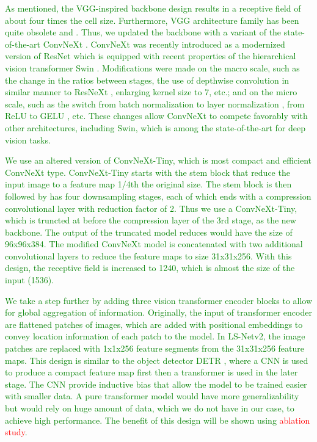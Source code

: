 \documentclass[journal]{IEEEtran}
\begin{document}
\textcolor{green}{As mentioned, the VGG-inspired backbone design results in a receptive field of about four times the cell size. Furthermore, VGG architecture family has been quite obsolete and . Thus, we updated the backbone with a variant of the state-of-the-art ConvNeXt \cite{convnext}. ConvNeXt was recently introduced as a modernized version of ResNet \cite{resnet} which is equipped with recent properties of the hierarchical vision transformer Swin \cite{swin}. Modifications were made on the macro scale, such as the change in the ratios between stages, the use of depthwise convolution in similar manner to ResNeXt \cite{resnext}, enlarging kernel size to 7, etc.; and on the micro scale, such as the switch from batch normalization \cite{batchnorm} to layer normalization \cite{layernorm}, from ReLU \cite{relu} to GELU \cite{gelu}, etc. These changes allow ConvNeXt to compete favorably with other architectures, including Swin, which is among the state-of-the-art for deep vision tasks.}

\textcolor{green}{We use an altered version of ConvNeXt-Tiny, which is most compact and efficient ConvNeXt type. ConvNeXt-Tiny starts with the stem block that reduce the input image to a feature map 1/4th the original size. The stem block is then followed by has four downsampling stages, each of which ends with a compression convolutional layer with reduction factor of 2. Thus we use a ConvNeXt-Tiny, which is truncted at before the compression layer of the 3rd stage, as the new backbone. The output of the truncated model reduces would have the size of 96x96x384. The modified ConvNeXt model is concatenated with two additional convolutional layers to reduce the feature maps to size 31x31x256. With this design, the receptive field is increased to 1240, which is almost the size of the input (1536).}

\textcolor{green}{We take a step further by adding three vision transformer encoder blocks \cite{16x16, attention} to allow for global aggregation of information. Originally, the input of transformer encoder are flattened patches of images, which are added with positional embeddings to convey location information of each patch to the model. In LS-Netv2, the image patches are replaced with 1x1x256 feature segments from the 31x31x256 feature maps. This design is similar to the object detector DETR \cite{DETR}, where a CNN is used to produce a compact feature map first then a transformer is used in the later stage. The CNN provide inductive bias that allow the model to be trained easier with smaller data. A pure transformer model would have more generalizability \cite{?} but would rely on huge amount of data, which we do not have in our case, to achieve high performance. The benefit of this design will be shown using \textcolor{red}{ablation study}.}
\end{document}
